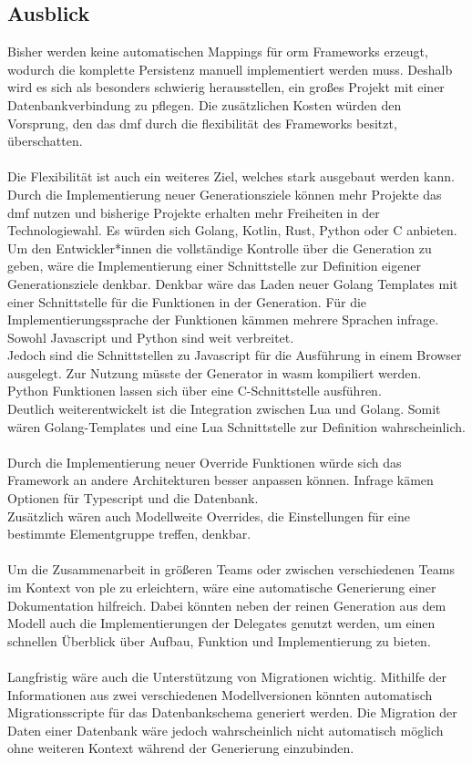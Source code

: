 \documentclass[./einleitung.tex]{subfiles}
\begin{document}
\subsection{Ausblick}
    Bisher werden keine automatischen Mappings für \acrshort{orm} Frameworks erzeugt, wodurch die komplette Persistenz manuell implementiert werden muss.
    Deshalb wird es sich als besonders schwierig herausstellen, ein großes Projekt mit einer Datenbankverbindung zu pflegen.
    Die zusätzlichen Kosten würden den Vorsprung, den das \acrshort{dmf} durch die flexibilität des Frameworks besitzt, überschatten.
    \\\\
    Die Flexibilität ist auch ein weiteres Ziel, welches stark ausgebaut werden kann.
    Durch die Implementierung neuer Generationsziele können mehr Projekte das \acrshort{dmf} nutzen und bisherige Projekte erhalten mehr Freiheiten in der Technologiewahl.
    Es würden sich Golang, Kotlin, Rust, Python oder C anbieten.\\
    Um den Entwickler*innen die vollständige Kontrolle über die Generation zu geben, wäre die Implementierung einer Schnittstelle zur Definition eigener Generationsziele denkbar.
    Denkbar wäre das Laden neuer Golang Templates mit einer Schnittstelle für die Funktionen in der Generation.
    Für die Implementierungssprache der Funktionen kämmen mehrere Sprachen infrage.
    Sowohl Javascript und Python sind weit verbreitet.\\
    Jedoch sind die Schnittstellen zu Javascript für die Ausführung in einem Browser ausgelegt.
    Zur Nutzung müsste der Generator in \acrfull{wasm} kompiliert werden.\\
    Python Funktionen lassen sich über eine C-Schnittstelle ausführen.\\
    Deutlich weiterentwickelt ist die Integration zwischen Lua und Golang.
    Somit wären Golang-Templates und eine Lua Schnittstelle zur Definition wahrscheinlich.
    \\\\
    Durch die Implementierung neuer Override Funktionen würde sich das Framework an andere Architekturen besser anpassen können.
    Infrage kämen Optionen für Typescript und die Datenbank.\\
    Zusätzlich wären auch Modellweite Overrides, die Einstellungen für eine bestimmte Elementgruppe treffen, denkbar.
    \\\\
    Um die Zusammenarbeit in größeren Teams oder zwischen verschiedenen Teams im Kontext von \acrshort{ple} zu erleichtern, wäre eine automatische Generierung einer Dokumentation hilfreich.
    Dabei könnten neben der reinen Generation aus dem Modell auch die Implementierungen der Delegates genutzt werden, um einen schnellen Überblick über Aufbau, Funktion und Implementierung zu bieten.
    \\\\
    Langfristig wäre auch die Unterstützung von Migrationen wichtig.
    Mithilfe der Informationen aus zwei verschiedenen Modellversionen könnten automatisch Migrationsscripte für das Datenbankschema generiert werden.
    Die Migration der Daten einer Datenbank wäre jedoch wahrscheinlich nicht automatisch möglich ohne weiteren Kontext während der Generierung einzubinden.
\end{document}
